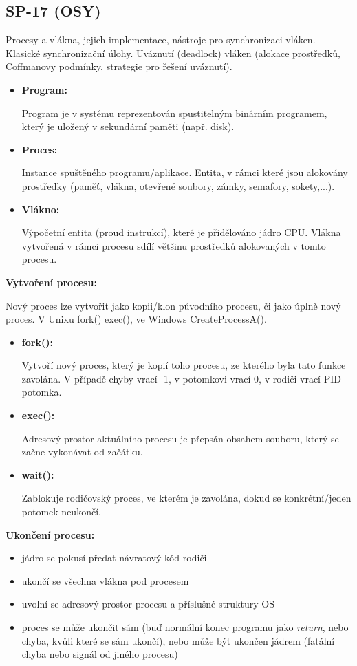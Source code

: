 \subsection{SP-17 (OSY)}
Procesy a vlákna, jejich implementace, nástroje pro synchronizaci vláken. Klasické synchronizační úlohy. Uváz\-nu\-tí (deadlock) vláken (alokace prostředků, Coffmanovy podmínky, strategie pro řešení uváznutí).

\begin{itemize}
	\item \textbf{Program:} 
	
	Program je v systému reprezentován spustitelným binárním programem, který je uložený v sekundární paměti (např. disk).
	
	\item \textbf{Proces:} 
	
	Instance spuštěného programu/aplikace. Entita, v rámci které jsou alokovány prostředky (paměť, vlákna, otevřené soubory, zámky, semafory, sokety,...).
	
	\item \textbf{Vlákno:} 
	
	Výpočetní entita (proud instrukcí), které je přidělováno jádro CPU. Vlákna vytvořená v rámci procesu sdílí většinu prostředků alokovaných v tomto procesu.
\end{itemize}

\textbf{Vytvoření procesu:}

Nový proces lze vytvořit jako kopii/klon původního procesu, či jako úplně nový proces. V Unixu fork() exec(), ve Windows CreateProcessA().

\begin{itemize}
	\item \textbf{fork():}
	
	Vytvoří nový proces, který je kopií toho procesu, ze kterého byla tato funkce zavolána. V případě chyby vrací -1, v potomkovi vrací 0, v rodiči vrací PID potomka.
	
	\item \textbf{exec():} 
	
	Adresový prostor aktuálního procesu je přepsán obsahem souboru, který se začne vykonávat od začátku.
	
	\item \textbf{wait():} 
	
	Zablokuje rodičovský proces, ve kterém je zavolána, dokud se konkrétní/jeden potomek neukončí.
\end{itemize}

\textbf{Ukončení procesu:}
\begin{itemize}
	\item jádro se pokusí předat návratový kód rodiči
	\item ukončí se všechna vlákna pod procesem
	\item uvolní se adresový prostor procesu a příslušné struktury OS
	\item proces se může ukončit sám (buď normální konec programu jako \textit{return}, nebo chyba, kvůli které se sám ukončí), nebo může být ukončen jádrem (fatální chyba nebo signál od jiného procesu)
\end{itemize}

